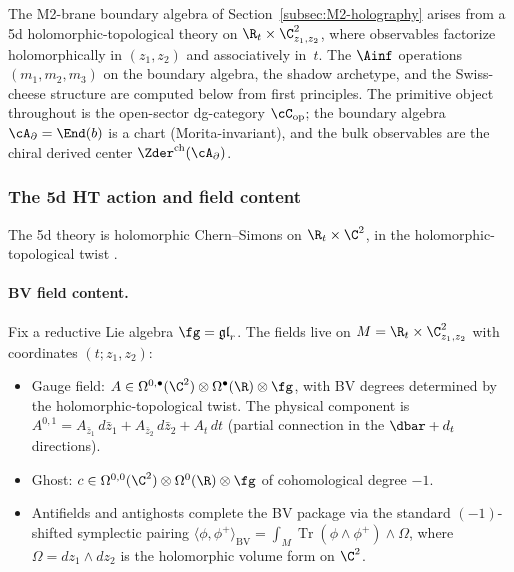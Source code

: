 The M2-brane boundary algebra of Section~\ref{subsec:M2-holography}
arises from a 5d holomorphic-topological theory on
$\R_t \times \C^2_{z_1,z_2}$, where observables factorize
holomorphically in $(z_1,z_2)$ and associatively in~$t$.
The $\Ainf$ operations $(m_1,m_2,m_3)$
on the boundary algebra, the shadow archetype, and the Swiss-cheese
structure are computed below from first principles. The primitive object throughout is the
open-sector dg-category $\cC_{\mathrm{op}}$; the boundary
algebra $\cA_\partial = \End(b)$ is a chart
(Morita-invariant), and the bulk observables are the chiral
derived center $\Zder^{\mathrm{ch}}(\cA_\partial)$.

\subsubsection{The 5d HT action and field content}

The 5d theory is holomorphic Chern--Simons on
$\R_t\times\C^2$, in the holomorphic-topological twist
\cite{costello-gaiotto,Costello-1705.02500v1}.

\paragraph{BV field content.}
Fix a reductive Lie algebra $\fg = \mathfrak{gl}_r$. The
fields live on $M = \R_t \times \C^2_{z_1,z_2}$ with
coordinates $(t; z_1, z_2)$:
\begin{itemize}[nosep]
\item Gauge field:
 $A \in \Omega^{0,\bullet}(\C^2) \otimes
 \Omega^\bullet(\R) \otimes \fg$,
 with BV degrees determined by the holomorphic-topological
 twist. The physical component is
 $A^{0,1} = A_{\bar z_1}\,d\bar z_1 +
 A_{\bar z_2}\,d\bar z_2 + A_t\,dt$
 (partial connection in the $\dbar + d_t$ directions).
\item Ghost: $c \in \Omega^{0,0}(\C^2)\otimes\Omega^0(\R)
 \otimes \fg$ of cohomological degree $-1$.
\item Antifields and antighosts complete the BV package
 via the standard $(-1)$-shifted symplectic pairing
 $\langle \phi, \phi^+ \rangle_{\mathrm{BV}} =
 \int_M \operatorname{Tr}(\phi \wedge \phi^+)
 \wedge \Omega$,
 where $\Omega = dz_1 \wedge dz_2$ is the holomorphic
 volume form on $\C^2$.
\end{itemize}

